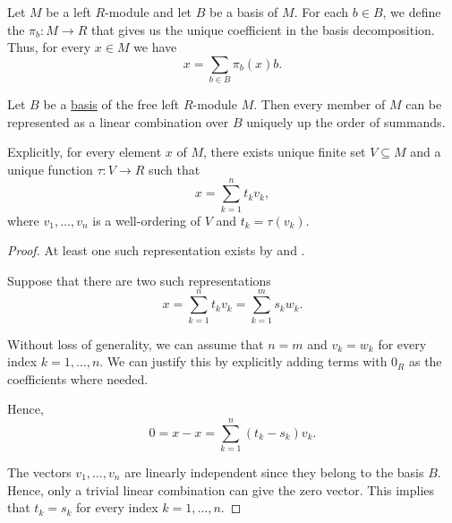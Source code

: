\begin{definition}\label{def:module_basis_projection}
  Let \( M \) be a left \( R \)-module and let \( B \) be a basis of \( M \). For each \( b \in B \), we define the  \( \pi_b: M \to R \) that gives us the unique coefficient in the basis decomposition. Thus, for every \( x \in M \) we have
  \begin{equation*}
    x = \sum_{b \in B} \pi_b(x) b.
  \end{equation*}

  \begin{proposition}\label{thm:module_basis_decomposition}
    Let \( B \) be a \hyperref[def:semimodule_basis/independent]{basis} of the free left \( R \)-module \( M \). Then every member of \( M \) can be represented as a linear combination over \( B \) uniquely up the order of summands.

    Explicitly, for every element \( x \) of \( M \), there exists unique finite set \( V \subseteq M \) and a unique function \( \tau: V \to R \) such that
    \begin{equation*}
      x = \sum_{k=1}^n t_k v_k,
    \end{equation*}
    where \( v_1, \ldots, v_n \) is a well-ordering of \( V \) and \( t_k = \tau(v_k) \).
  \end{proposition}
  \begin{proof}
    At least one such representation exists by  and .

    Suppose that there are two such representations
    \begin{equation*}
      x = \sum_{k=1}^n t_k v_k = \sum_{k=1}^m s_k w_k.
    \end{equation*}

    Without loss of generality, we can assume that \( n = m \) and \( v_k = w_k \) for every index \( k = 1, \ldots, n \). We can justify this by explicitly adding terms with \( 0_R \) as the coefficients where needed.

    Hence,
    \begin{equation*}
      0 = x - x = \sum_{k=1}^n (t_k - s_k) v_k.
    \end{equation*}

    The vectors \( v_1, \ldots, v_n \) are linearly independent since they belong to the basis \( B \). Hence, only a trivial linear combination can give the zero vector. This implies that \( t_k = s_k \) for every index \( k = 1, \ldots, n \).


\end{proof}
\end{definition}
